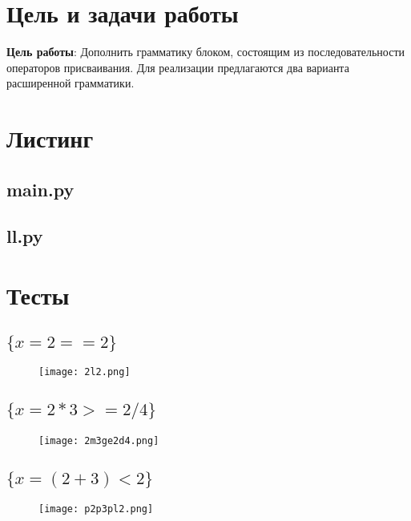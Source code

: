 \newpage
	\section{Цель и задачи работы}
		\textbf{Цель работы}: Дополнить грамматику блоком, состоящим из последовательности операторов присваивания. 
			Для реализации предлагаются два варианта расширенной грамматики.


	\section{Листинг}
        
        
        \subsection{main.py}
        

        \subsection{ll.py}
        



	\section{Тесты}
		\subsection{$\{x=2==2\}$}
			\begin{figure}[h]
				\texttt{[image: 2l2.png]}
			\end{figure}

		\newpage

		\subsection{$\{x=2*3>=2/4\}$}
			\begin{figure}[h]
				\texttt{[image: 2m3ge2d4.png]}
			\end{figure}

		\newpage

		\subsection{$\{x=(2+3)<2\}$}
			\begin{figure}[h]
				\texttt{[image: p2p3pl2.png]}
			\end{figure}


